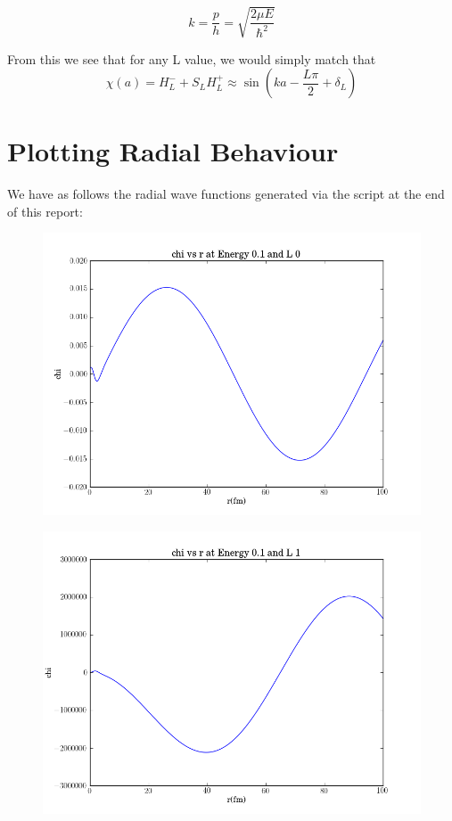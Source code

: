 \documentclass[11pt]{article} %
\begin{document}
\begin{equation}
k=\frac{p}{h}=\sqrt{\frac{2\mu E}{\hbar^2}}
\end{equation}

From this we see that for any L value, we would simply match that\\

\begin{equation}
\chi(a)=H_L^-+S_LH_L^+\approx \sin(ka-\frac{L\pi}{2}+\delta_L)
\end{equation}

\section{Plotting Radial Behaviour}

We have as follows the radial wave functions generated via the script at the end of this report:\\


\vspace{1mm}
\begin{figure}[H]
\centering
\includegraphics[width=.5\linewidth]{"chiE1L0"}
\end{figure}
\vspace{1mm}


\vspace{1mm}
\begin{figure}[H]
\centering
\includegraphics[width=.5\linewidth]{"chiE1L1"}
\end{figure}
\vspace{1mm}
\end{document}
